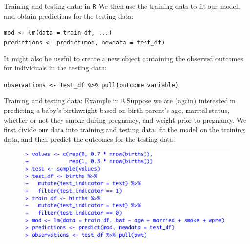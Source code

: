\documentclass[10pt,t]{beamer}
\begin{document}
\begin{frame}{Training and testing data: in \texttt{R}}
We then use the training data to fit our model, and obtain predictions for the testing data:

\vspace{0.3cm}

\texttt{mod <- lm(data = train\_df, ...)} \\
\texttt{predictions <- predict(mod, newdata = test\_df)}

\vspace{0.3cm} \pause

It might also be useful to create a new object containing the observed outcomes for individuals in the testing data:

\vspace{0.3cm}

\texttt{observations <- test\_df \%>\% pull(outcome variable)}

\end{frame}

\begin{frame}{Training and testing data: Example in \texttt{R}}
Suppose we are (again) interested in predicting a baby's birthweight based on birth parent's age, marital status, whether or not they smoke during pregnancy, and weight prior to pregnancy. We first divide our data into training and testing data, fit the model on the training data, and then predict the outcomes for the testing data:

\begin{figure}
	\centering \includegraphics[scale=0.5]{figures/traintest2.png}
\end{figure}
\end{frame}
\end{document}
